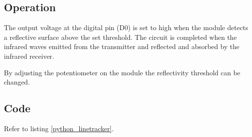\subsection*{Operation}
The output voltage at the digital pin (D0) is set to high when the module detects a reflective surface above the set threshold. The circuit is completed when the infrared waves emitted from the transmitter and reflected and absorbed by the infrared receiver.

By adjusting the potentiometer on the module the reflectivity threshold can be changed.
\subsection*{Code}
Refer to listing \ref{python_linetracker}.
%